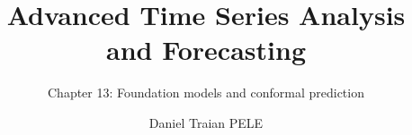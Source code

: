 \title[Advanced Time Series Analysis and Forecasting]{Advanced Time Series Analysis and Forecasting}
\subtitle{Chapter 13: Foundation models and conformal prediction}
\author[D.T. Pele]{Daniel Traian PELE}
\date{}

\providecommand{\atsapplink}[3]{\hypertarget{#2}{}\hyperlink{#1}{\beamergotobutton{#3}}}  %
\providecommand{\atsappback}[2]{\begin{tikzpicture}[remember picture,overlay]\node[anchor=south east] at ([xshift=-3mm,yshift=7mm]current page.south east){\hyperlink{#1}{\beamerreturnbutton{#2}}};\end{tikzpicture}}  %
\providecommand{\atschlink}[2]{\href{#1}{#2}}  %
\providecommand{\atschlinkt}[2]{\href{#1}{\usebeamercolor[fg]{frametitle}#2}}  %


